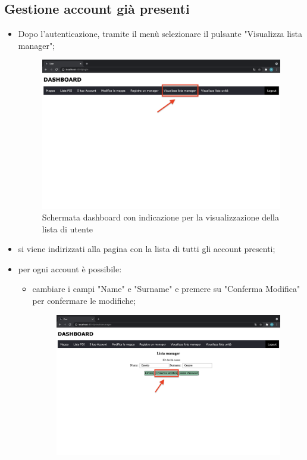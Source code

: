 \subsection{Gestione account già presenti}
\begin{itemize}
    \item Dopo l'autenticazione, tramite il menù selezionare il pulsante "Visualizza lista manager";
    \begin{figure}[H]
        \centering
        \includegraphics[scale=0.12]{res/images/dashboard5.png}
        \caption{Schermata dashboard con indicazione per la visualizzazione della lista di utente}
    \end{figure}
    \item si viene indirizzati alla pagina con la lista di tutti gli account presenti;
    \item per ogni account è possibile:
        \begin{itemize}
            \item cambiare i campi "Name" e "Surname" e premere su "Conferma Modifica" per confermare le modifiche;
            \begin{figure}[H]
                \centering
                \includegraphics[scale=0.12]{res/images/modificamanager.png}

\end{figure}
\end{itemize}
\end{itemize}
